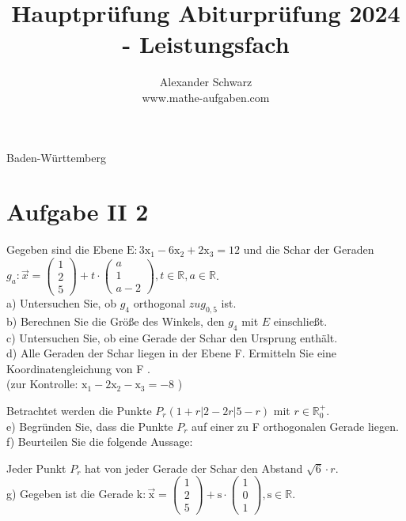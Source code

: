 \documentclass[10pt]{article}
\title{Hauptprüfung Abiturprüfung 2024 - Leistungsfach }
\author{Alexander Schwarz\\
www.mathe-aufgaben.com}
\date{}
\begin{document}
\maketitle
 Baden-Württemberg

\section*{Aufgabe II 2}
Gegeben sind die Ebene $\mathrm{E}: 3 \mathrm{x}_{1}-6 \mathrm{x}_{2}+2 \mathrm{x}_{3}=12$ und die Schar der Geraden $g_{a}: \vec{x}=\left(\begin{array}{l}1 \\ 2 \\ 5\end{array}\right)+t \cdot\left(\begin{array}{c}a \\ 1 \\ a-2\end{array}\right), t \in \mathbb{R}, a \in \mathbb{R}$.\\
a) Untersuchen Sie, ob $g_{4}$ orthogonal $z u g_{0,5}$ ist.\\
b) Berechnen Sie die Größe des Winkels, den $g_{4}$ mit $E$ einschließt.\\
c) Untersuchen Sie, ob eine Gerade der Schar den Ursprung enthält.\\
d) Alle Geraden der Schar liegen in der Ebene F. Ermitteln Sie eine Koordinatengleichung von F .\\
(zur Kontrolle: $\mathrm{x}_{1}-2 \mathrm{x}_{2}-\mathrm{x}_{3}=-8$ )

Betrachtet werden die Punkte $P_{r}(1+r|2-2 r| 5-r)$ mit $r \in \mathbb{R}_{0}^{+}$.\\
e) Begründen Sie, dass die Punkte $P_{r}$ auf einer zu F orthogonalen Gerade liegen.\\
f) Beurteilen Sie die folgende Aussage:

Jeder Punkt $P_{r}$ hat von jeder Gerade der Schar den Abstand $\sqrt{6} \cdot r$.\\
g) Gegeben ist die Gerade $\mathrm{k}: \overrightarrow{\mathrm{x}}=\left(\begin{array}{l}1 \\ 2 \\ 5\end{array}\right)+\mathrm{s} \cdot\left(\begin{array}{l}1 \\ 0 \\ 1\end{array}\right), \mathrm{s} \in \mathbb{R}$.
\end{document}
